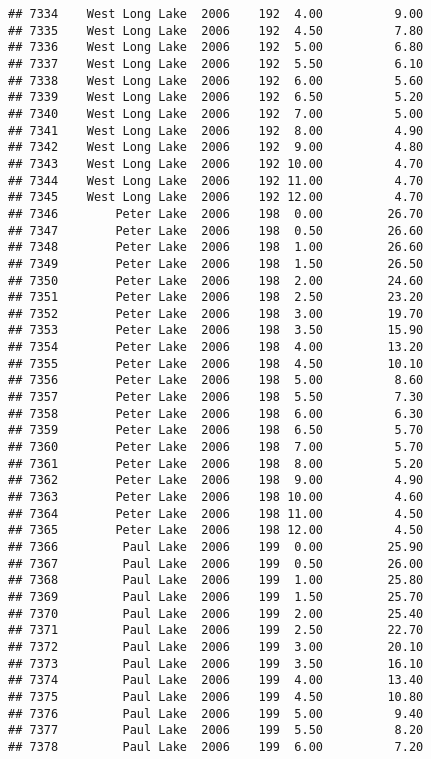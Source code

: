 \documentclass[
]{article}
\begin{document}
\begin{verbatim}
## 7334    West Long Lake  2006    192  4.00          9.00
## 7335    West Long Lake  2006    192  4.50          7.80
## 7336    West Long Lake  2006    192  5.00          6.80
## 7337    West Long Lake  2006    192  5.50          6.10
## 7338    West Long Lake  2006    192  6.00          5.60
## 7339    West Long Lake  2006    192  6.50          5.20
## 7340    West Long Lake  2006    192  7.00          5.00
## 7341    West Long Lake  2006    192  8.00          4.90
## 7342    West Long Lake  2006    192  9.00          4.80
## 7343    West Long Lake  2006    192 10.00          4.70
## 7344    West Long Lake  2006    192 11.00          4.70
## 7345    West Long Lake  2006    192 12.00          4.70
## 7346        Peter Lake  2006    198  0.00         26.70
## 7347        Peter Lake  2006    198  0.50         26.60
## 7348        Peter Lake  2006    198  1.00         26.60
## 7349        Peter Lake  2006    198  1.50         26.50
## 7350        Peter Lake  2006    198  2.00         24.60
## 7351        Peter Lake  2006    198  2.50         23.20
## 7352        Peter Lake  2006    198  3.00         19.70
## 7353        Peter Lake  2006    198  3.50         15.90
## 7354        Peter Lake  2006    198  4.00         13.20
## 7355        Peter Lake  2006    198  4.50         10.10
## 7356        Peter Lake  2006    198  5.00          8.60
## 7357        Peter Lake  2006    198  5.50          7.30
## 7358        Peter Lake  2006    198  6.00          6.30
## 7359        Peter Lake  2006    198  6.50          5.70
## 7360        Peter Lake  2006    198  7.00          5.70
## 7361        Peter Lake  2006    198  8.00          5.20
## 7362        Peter Lake  2006    198  9.00          4.90
## 7363        Peter Lake  2006    198 10.00          4.60
## 7364        Peter Lake  2006    198 11.00          4.50
## 7365        Peter Lake  2006    198 12.00          4.50
## 7366         Paul Lake  2006    199  0.00         25.90
## 7367         Paul Lake  2006    199  0.50         26.00
## 7368         Paul Lake  2006    199  1.00         25.80
## 7369         Paul Lake  2006    199  1.50         25.70
## 7370         Paul Lake  2006    199  2.00         25.40
## 7371         Paul Lake  2006    199  2.50         22.70
## 7372         Paul Lake  2006    199  3.00         20.10
## 7373         Paul Lake  2006    199  3.50         16.10
## 7374         Paul Lake  2006    199  4.00         13.40
## 7375         Paul Lake  2006    199  4.50         10.80
## 7376         Paul Lake  2006    199  5.00          9.40
## 7377         Paul Lake  2006    199  5.50          8.20
## 7378         Paul Lake  2006    199  6.00          7.20

\end{verbatim}
\end{document}
